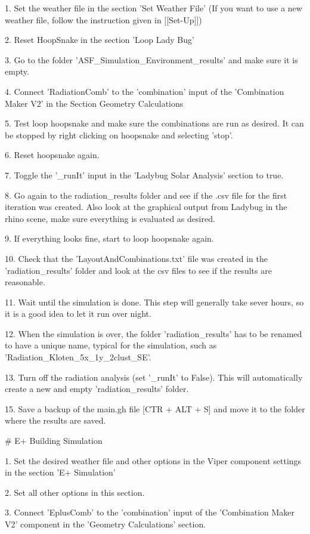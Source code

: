 	1. Set the weather file in the section 'Set Weather File' (If you want to use a new weather file, follow the instruction given in [[Set-Up]])

	2. Reset HoopSnake in the section 'Loop Lady Bug'

	3. Go to the folder 'ASF_Simulation\Simulation_Environment\data\grasshopper\LadyBug\radiation_results' and make sure it is empty. 

	4. Connect 'RadiationComb' to the 'combination' input of the 'Combination Maker V2' in the Section Geometry Calculations

	5. Test loop hoopsnake and make sure the combinations are run as desired. It can be stopped by right clicking on hoopsnake and selecting 'stop'. 

	6. Reset hoopsnake again. 

	7. Toggle the '_runIt' input in the 'Ladybug Solar Analysis' section to true. 

	8. Go again to the radiation_results folder and see if the .csv file for the first iteration was created. Also look at the graphical output from Ladybug in the rhino scene, make sure everything is evaluated as desired. 

	9. If everything looks fine, start to loop hoopsnake again. 

	10. Check that the 'LayoutAndCombinations.txt' file was created in the 'radiation_results' folder and look at the csv files to see if the results are reasonable. 

	11. Wait until the simulation is done. This step will generally take sever hours, so it is a good idea to let it run over night. 

	12. When the simulation is over, the folder 'radiation_results' has to be renamed to have a unique name, typical for the simulation, such as 'Radiation_Kloten_5x_1y_2clust_SE'. 

	13. Turn off the radiation analysis (set '_runIt' to False). This will automatically create a new and empty 'radiation_results' folder.  

	15. Save a backup of the main.gh file [CTR + ALT + S] and move it to the folder where the results are saved. 

	# E+ Building Simulation

	1. Set the desired weather file and other options in the Viper component settings in the section 'E+ Simulation'

	2. Set all other options in this section. 

	3. Connect 'EplusComb' to the 'combination' input of the 'Combination Maker V2' component in the 'Geometry Calculations' section.  

